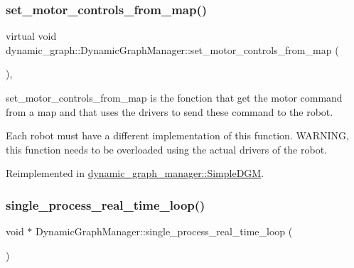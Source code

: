 \subsubsection{\texorpdfstring{set\+\_\+motor\+\_\+controls\+\_\+from\+\_\+map()}{set\_motor\_controls\_from\_map()}}
{\footnotesize\ttfamily virtual void dynamic\+\_\+graph\+::\+Dynamic\+Graph\+Manager\+::set\+\_\+motor\+\_\+controls\+\_\+from\+\_\+map (\begin{DoxyParamCaption}\item[{const \hyperlink{namespacedynamic__graph_a51212ed7fa4ae81e7b362a27f09b7ab8}{Vector\+D\+G\+Map} \&}]{ }\end{DoxyParamCaption})\hspace{0.3cm}{\ttfamily [inline]}, {\ttfamily [virtual]}}



set\+\_\+motor\+\_\+controls\+\_\+from\+\_\+map is the fonction that get the motor command from a map and that uses the drivers to send these command to the robot. 

Each robot must have a different implementation of this function. W\+A\+R\+N\+I\+NG, this function needs to be overloaded using the actual drivers of the robot. 

Reimplemented in \hyperlink{classdynamic__graph__manager_1_1SimpleDGM_ad38ccd35cc0c409a0aaefa8565634109}{dynamic\+\_\+graph\+\_\+manager\+::\+Simple\+D\+GM}.

\mbox{\label{classdynamic__graph_1_1DynamicGraphManager_adf3adb88c5913b21b51c1f7bfab6d0f3}} 
\subsubsection{\texorpdfstring{single\+\_\+process\+\_\+real\+\_\+time\+\_\+loop()}{single\_process\_real\_time\_loop()}}
{\footnotesize\ttfamily void $\ast$ Dynamic\+Graph\+Manager\+::single\+\_\+process\+\_\+real\+\_\+time\+\_\+loop (\begin{DoxyParamCaption}{ }\end{DoxyParamCaption})\hspace{0.3cm}{\ttfamily [private]}}



